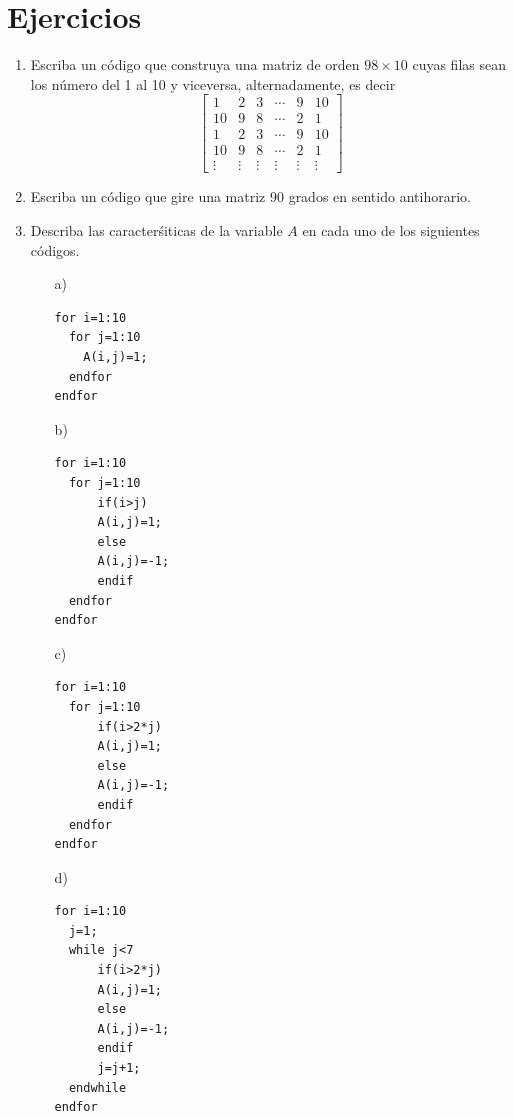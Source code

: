 \documentclass[letter,11pt]{article}
\newcommand\0{\mathbf{0}}
\begin{document}
\section{Ejercicios}
  \begin{enumerate}
   \item Escriba un c\'odigo que construya una matriz de orden $98\times 10$ cuyas filas sean los n\'umero del 1 al 10 y viceversa, alternadamente, es 
   decir
	$$
	\left [
	     \begin{array}{cccccc}
	      1 & 2 & 3 & \cdots & 9 & 10  \\
	      10 & 9 & 8 & \cdots & 2 & 1 \\
     	      1 & 2 & 3 & \cdots & 9 & 10 \\
	      10 & 9 & 8 & \cdots & 2 & 1 \\
	      \vdots & \vdots & \vdots & \vdots & \vdots & \vdots 
	     \end{array}
	\right]
	$$
  \item Escriba un c\'odigo que gire una matriz 90 grados en sentido antihorario.
  
  \item Describa las caracter\'siticas de la variable $A$ en cada uno de los siguientes c\'odigos.
	\begin{multicols}{2}
    \begin{itemize}
     \item[a)] 
\begin{lstlisting}
for i=1:10
  for j=1:10
    A(i,j)=1;
  endfor
endfor
\end{lstlisting}

      \item[b)] 
\begin{lstlisting}
for i=1:10
  for j=1:10
      if(i>j)
      A(i,j)=1;
      else
      A(i,j)=-1;
      endif
  endfor
endfor
\end{lstlisting}

      \item[c)] 
\begin{lstlisting}
for i=1:10
  for j=1:10
      if(i>2*j)
      A(i,j)=1;
      else
      A(i,j)=-1;
      endif
  endfor
endfor
\end{lstlisting}

   \item[d)] 
\begin{lstlisting}
for i=1:10
  j=1;
  while j<7
      if(i>2*j)
      A(i,j)=1;
      else
      A(i,j)=-1;
      endif
      j=j+1;
  endwhile
endfor
\end{lstlisting}


\end{itemize}
\end{multicols}
\end{enumerate}
\end{document}
